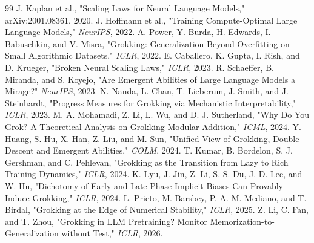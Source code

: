 \documentclass[10pt]{article}
\theoremstyle{compact}
\begin{document}
\vspace{-0.1em}
{\footnotesize
\begin{thebibliography}{99}
\setlength{\itemsep}{0pt}
\setlength{\parsep}{0pt}
J. Kaplan et al., "Scaling Laws for Neural Language Models," arXiv:2001.08361,
2020.
J. Hoffmann et al., "Training Compute-Optimal Large Language Models,"
\emph{NeurIPS}, 2022.
A. Power, Y. Burda, H. Edwards, I. Babuschkin, and V. Misra, "Grokking:
Generalization Beyond Overfitting on Small Algorithmic Datasets," \emph{ICLR},
2022.
E. Caballero, K. Gupta, I. Rish, and D. Krueger, "Broken Neural Scaling
Laws," \emph{ICLR}, 2023.
R. Schaeffer, B. Miranda, and S. Koyejo, "Are Emergent Abilities of Large
Language Models a Mirage?" \emph{NeurIPS}, 2023.
N. Nanda, L. Chan, T. Lieberum, J. Smith, and J. Steinhardt, "Progress
Measures for Grokking via Mechanistic Interpretability," \emph{ICLR}, 2023.
M. A. Mohamadi, Z. Li, L. Wu, and D. J. Sutherland, "Why Do You Grok? A
Theoretical Analysis on Grokking Modular Addition," \emph{ICML}, 2024.
Y. Huang, S. Hu, X. Han, Z. Liu, and M. Sun, "Unified View of Grokking,
Double Descent and Emergent Abilities," \emph{COLM}, 2024.
T. Kumar, B. Bordelon, S. J. Gershman, and C. Pehlevan, "Grokking as the
Transition from Lazy to Rich Training Dynamics," \emph{ICLR}, 2024.
K. Lyu, J. Jin, Z. Li, S. S. Du, J. D. Lee, and W. Hu, "Dichotomy of Early and
Late Phase Implicit Biases Can Provably Induce Grokking," \emph{ICLR}, 2024.
L. Prieto, M. Barsbey, P. A. M. Mediano, and T. Birdal, "Grokking at the Edge
of Numerical Stability," \emph{ICLR}, 2025.
Z. Li, C. Fan, and T. Zhou, "Grokking in LLM Pretraining? Monitor
Memorization-to-Generalization without Test," \emph{ICLR}, 2026.
\end{thebibliography}
}
\end{document}
